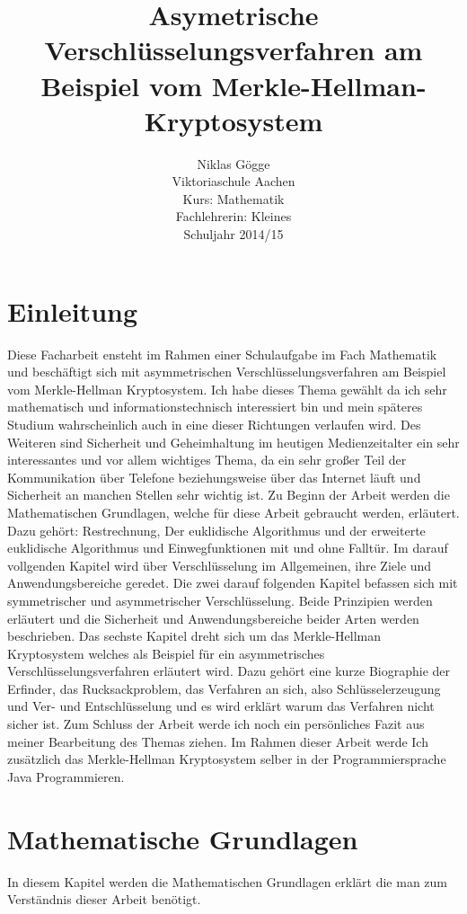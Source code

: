 \documentclass[a4paper,12pt,titlepage]{article}
\author
{
Niklas Gögge\\
Viktoriaschule Aachen\\
Kurs: Mathematik\\
Fachlehrerin: Kleines\\
Schuljahr 2014/15
}
\begin{document}
\title{Asymetrische Verschlüsselungsverfahren am Beispiel vom Merkle-Hellman-Kryptosystem}
\maketitle

\newpage
\tableofcontents
\newpage

\section{Einleitung}
Diese Facharbeit ensteht im Rahmen einer Schulaufgabe im Fach Mathematik und beschäftigt sich mit asymmetrischen Verschlüsselungsverfahren am Beispiel vom Merkle-Hellman Kryptosystem. Ich habe dieses Thema gewählt da ich sehr mathematisch und informationstechnisch interessiert bin und mein späteres Studium wahrscheinlich auch in eine dieser Richtungen verlaufen wird. Des Weiteren sind Sicherheit und Geheimhaltung im heutigen Medienzeitalter ein sehr interessantes und vor allem wichtiges Thema, da ein sehr großer Teil der Kommunikation über Telefone beziehungsweise über das Internet läuft und Sicherheit an manchen Stellen sehr wichtig ist. \newline
Zu Beginn der Arbeit werden die Mathematischen Grundlagen, welche für diese Arbeit gebraucht werden, erläutert. Dazu gehört: Restrechnung, Der euklidische Algorithmus und der erweiterte euklidische Algorithmus und Einwegfunktionen mit und ohne Falltür. Im darauf vollgenden Kapitel wird über Verschlüsselung im Allgemeinen, ihre Ziele und Anwendungsbereiche geredet.
Die zwei darauf folgenden Kapitel befassen sich mit symmetrischer und asymmetrischer Verschlüsselung. Beide Prinzipien werden erläutert und die Sicherheit und Anwendungsbereiche beider Arten werden beschrieben.
Das sechste Kapitel dreht sich um das Merkle-Hellman Kryptosystem welches als Beispiel für ein asymmetrisches Verschlüsselungsverfahren erläutert wird. Dazu gehört eine kurze Biographie der Erfinder, das Rucksackproblem, das Verfahren an sich, also Schlüsselerzeugung und Ver- und Entschlüsselung und es wird erklärt warum das Verfahren nicht sicher ist.
Zum Schluss der Arbeit werde ich noch ein persönliches Fazit aus meiner Bearbeitung des Themas ziehen.\newline
Im Rahmen dieser Arbeit werde Ich zusätzlich das Merkle-Hellman Kryptosystem selber in der Programmiersprache Java Programmieren.
\newpage 

\section{Mathematische Grundlagen}
In diesem Kapitel werden die Mathematischen Grundlagen erklärt die man zum Verständnis dieser Arbeit benötigt.
\end{document}
